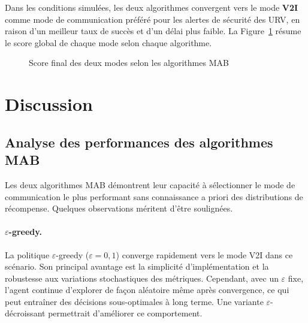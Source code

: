 \documentclass[12pt,a4paper]{article}
\begin{document}
Dans les conditions simulées, les deux algorithmes convergent vers le mode \textbf{V2I}
comme mode de communication préféré pour les alertes de sécurité des URV, en raison
d'un meilleur taux de succès et d'un délai plus faible. La Figure~\ref{fig:decision}
résume le score global de chaque mode selon chaque algorithme.

\begin{figure}[H]
\centering
{}
\caption{Score final des deux modes selon les algorithmes MAB}
\label{fig:decision}
\end{figure}

\section{Discussion}
\label{sec:discussion}

\subsection{Analyse des performances des algorithmes MAB}

Les deux algorithmes MAB démontrent leur capacité à sélectionner le mode de
communication le plus performant sans connaissance a priori des distributions
de récompense. Quelques observations méritent d'être soulignées.

\paragraph{$\varepsilon$-greedy.}
La politique $\varepsilon$-greedy ($\varepsilon = 0{,}1$) converge rapidement
vers le mode V2I dans ce scénario. Son principal avantage est la simplicité
d'implémentation et la robustesse aux variations stochastiques des métriques.
Cependant, avec un $\varepsilon$ fixe, l'agent continue d'explorer de façon
aléatoire même après convergence, ce qui peut entraîner des décisions sous-optimales
à long terme. Une variante $\varepsilon$-décroissant permettrait d'améliorer ce
comportement.
\end{document}
